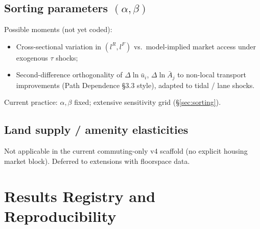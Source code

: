 \documentclass[11pt]{article}
\newcommand{\ubar}{\bar u}
\newcommand{\Abar}{\bar A}
\begin{document}
\subsection{Sorting parameters $(\alpha,\beta)$}

Possible moments (not yet coded):
\begin{itemize}[leftmargin=2em]
  \item Cross-sectional variation in $(l^R,l^F)$ vs.\ model-implied
        market access under exogenous $\tau$ shocks;
  \item Second-difference orthogonality of $\Delta\ln\ubar_i$,
        $\Delta\ln\Abar_j$ to non-local transport improvements (Path
        Dependence \S3.3 style), adapted to tidal / lane shocks.
\end{itemize}
Current practice: $\alpha,\beta$ fixed; extensive sensitivity grid
(\S\ref{sec:sorting}).

\subsection{Land supply / amenity elasticities}

Not applicable in the current commuting-only v4 scaffold (no explicit
housing market block).  Deferred to extensions with floorspace data.

\section{Results Registry and Reproducibility}\label{sec:registry}
\end{document}
